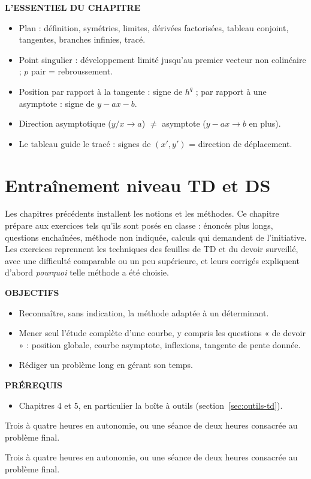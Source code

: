 \documentclass[a4paper,11pt]{article}
\numberwithin{equation}{section}
\numberwithin{figure}{section}
\numberwithin{table}{section}
\theoremstyle{enonce}
\theoremstyle{exemple}
\theoremstyle{remarque}
\newcommand{\ouverture}[3]{%
  \begin{tcolorbox}[enhanced,colback=Fond,colframe=Fond,arc=0pt,boxrule=0pt,left=12pt,right=12pt,top=10pt,bottom=10pt,
     before skip=1.2em,after skip=1.6em]
  \begin{minipage}[t]{0.56\linewidth}
  {\sffamily\bfseries\small\color{Bleu}OBJECTIFS}\par\vspace{0.3em}\small #1
  \end{minipage}\hfill
  \begin{minipage}[t]{0.38\linewidth}
  {\sffamily\bfseries\small\color{Bleu}PRÉREQUIS}\par\vspace{0.3em}\small #2
  \ifx\relax#3\relax\else\par\vspace{0.6em}{\sffamily\bfseries\small\color{Bleu}DURÉE}\par\vspace{0.2em}\small #3\fi
  \end{minipage}
  \end{tcolorbox}}
\newenvironment{essentiel}{\par\needspace{12\baselineskip}\vspace{1.5em}%
  \begin{tcolorbox}[enhanced,unbreakable,colback=white,colframe=white,boxrule=0pt,arc=0pt,
   borderline north={1.4pt}{0pt}{Ocre},left=2pt,right=2pt,top=8pt,bottom=4pt]
  {\sffamily\bfseries\color{Ocre}L'ESSENTIEL DU CHAPITRE}\par\medskip}{\end{tcolorbox}}
\begin{document}
\begin{essentiel}\label{ess:5}
\begin{itemize}
\item Plan : définition, symétries, limites, dérivées factorisées, tableau conjoint, tangentes, branches infinies, tracé.
\item Point singulier : développement limité jusqu'au premier vecteur non colinéaire ; $p$ pair = rebroussement.
\item Position par rapport à la tangente : signe de $h^q$ ; par rapport à une asymptote : signe de $y-ax-b$.
\item Direction asymptotique ($y/x\to a$) $\neq$ asymptote ($y-ax\to b$ en plus).
\item Le tableau guide le tracé : signes de $(x',y')$ = direction de déplacement.
\end{itemize}
\end{essentiel}
\clearpage
\section{Entraînement niveau TD et DS}\label{sec:entrainement}

Les chapitres précédents installent les notions et les méthodes. Ce chapitre prépare aux exercices tels qu'ils sont posés
en classe : énoncés plus longs, questions enchaînées, méthode non indiquée, calculs qui demandent de l'initiative. Les
exercices reprennent les techniques des feuilles de TD et du devoir surveillé, avec une difficulté comparable ou un peu
supérieure, et leurs corrigés expliquent d'abord \emph{pourquoi} telle méthode a été choisie.

\ouverture{%
\begin{itemize}
\item Reconnaître, sans indication, la méthode adaptée à un déterminant.
\item Mener seul l'étude complète d'une courbe, y compris les questions « de devoir » : position globale, courbe
      asymptote, inflexions, tangente de pente donnée.
\item Rédiger un problème long en gérant son temps.
\end{itemize}}{%
\begin{itemize}
\item Chapitres 4 et 5, en particulier la boîte à outils (section~\ref{sec:outils-td}).
\end{itemize}}{Trois à quatre heures en autonomie, ou une séance de deux heures consacrée au problème final.}
\end{document}
